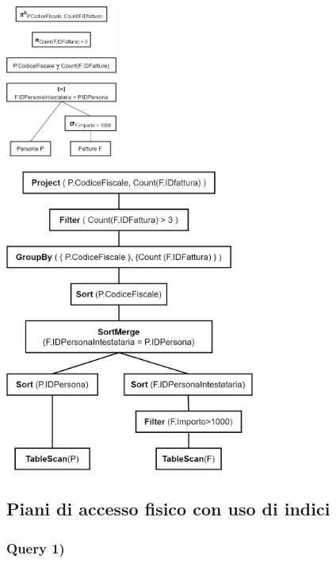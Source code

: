 \documentclass[a4paper,12pt]{article}
\begin{document}
\begin{minipage}{\textwidth}
\begin{multicols}{2}

\null \vfill
\includegraphics[height=5cm]{ Albero logico 3.png }
\vfill \null

\columnbreak

\includegraphics[height=10cm]{ Albero fisico 3.png }
\end{multicols}
\end{minipage}

 \subsection{ Piani di accesso fisico con uso di indici }

 \subsubsection{ Query 1) }
\end{document}
